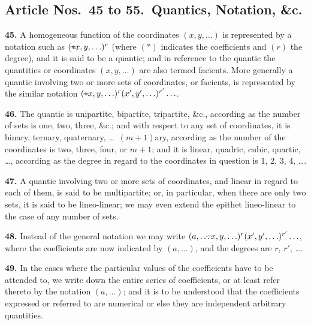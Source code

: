 \documentclass[11pt,a4paper]{article}
\theoremstyle{definition}
\begin{document}
\subsection*{Article Nos.\ 45 to 55.\ Quantics, Notation, \&c.}

\setcounter{page}{463}

\noindent\textbf{45.} A homogeneous function of the coordinates $(x,y,\ldots)$ is represented by a notation such as $({*}\!\hbox{\hspace{-0.5em}}\raisebox{0.3ex}{$\scriptstyle\frown$}\!x,y,\ldots)^r$ (where $(*)$ indicates the coefficients and $(r)$ the degree), and it is said to be a quantic; and in reference to the quantic the quantities or coordinates $(x,y,\ldots)$ are also termed facients. More generally a quantic involving two or more sets of coordinates, or facients, is represented by the similar notation $({*}\!\hbox{\hspace{-0.5em}}\raisebox{0.3ex}{$\scriptstyle\frown$}\!x,y,\ldots)^r(x',y',\ldots)^{r'}\ldots$.

\noindent\textbf{46.} The quantic is unipartite, bipartite, tripartite, \&c., according as the number of sets is one, two, three, \&c.; and with respect to any set of coordinates, it is binary, ternary, quaternary, \ldots\ $(m+1)$ary, according as the number of the coordinates is two, three, four, or $m+1$; and it is linear, quadric, cubic, quartic, \ldots, according as the degree in regard to the coordinates in question is 1, 2, 3, 4, \ldots.

\noindent\textbf{47.} A quantic involving two or more sets of coordinates, and linear in regard to each of them, is said to be multipartite; or, in particular, when there are only two sets, it is said to be lineo-linear; we may even extend the epithet lineo-linear to the case of any number of sets.

\noindent\textbf{48.} Instead of the general notation we may write $(a,\ldots\!\hbox{\hspace{-0.5em}}\raisebox{0.3ex}{$\scriptstyle\frown$}\!x,y,\ldots)^r(x',y',\ldots)^{r'}\ldots$, where the coefficients are now indicated by $(a,\ldots)$, and the degrees are $r$, $r'$, \ldots.

\noindent\textbf{49.} In the cases where the particular values of the coefficients have to be attended to, we write down the entire series of coefficients, or at least refer thereto by the notation $(a,\ldots)$; and it is to be understood that the coefficients expressed or referred to are numerical or else they are independent arbitrary quantities.
\end{document}
